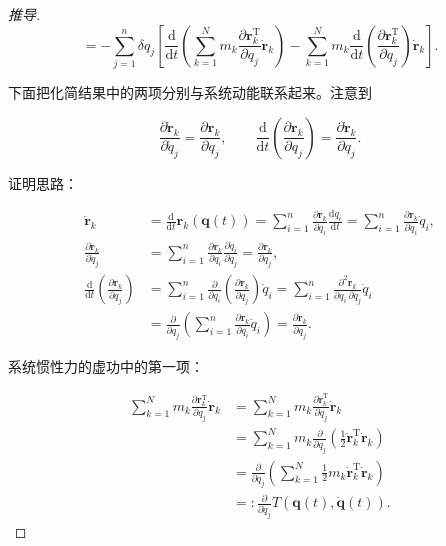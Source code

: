 \begin{proof}[推导]
\[
= -\sum_{j=1}^{n} \delta q_j \left[ \frac{\mathrm{d}}{\mathrm{d}t}\left(\sum_{k=1}^{N} m_k \frac{\partial \boldsymbol{r}_k^{\mathrm{T}}}{\partial q_j}\dot{\boldsymbol{r}}_k\right) - \sum_{k=1}^{N} m_k \frac{\mathrm{d}}{\mathrm{d}t}\left(\frac{\partial \boldsymbol{r}_k^{\mathrm{T}}}{\partial q_j}\right)\dot{\boldsymbol{r}}_k \right].
\]

下面把化简结果中的两项分别与系统动能联系起来。注意到

\[
\frac{\partial \dot{\boldsymbol{r}}_k}{\partial \dot{q}_j} = \frac{\partial \boldsymbol{r}_k}{\partial q_j},
\qquad
\frac{\mathrm{d}}{\mathrm{d}t}\left(\frac{\partial \boldsymbol{r}_k}{\partial q_j}\right) = \frac{\partial \dot{\boldsymbol{r}}_k}{\partial q_j}.
\]

证明思路：

\[
\begin{aligned}
\dot{\boldsymbol{r}}_k &= \frac{\mathrm{d}}{\mathrm{d}t}\boldsymbol{r}_k\left(\boldsymbol{q}(t)\right) = \sum_{i=1}^{n} \frac{\partial \boldsymbol{r}_k}{\partial q_i}\frac{\mathrm{d}q_i}{\mathrm{d}t} = \sum_{i=1}^{n} \frac{\partial \boldsymbol{r}_k}{\partial q_i}\dot{q}_i, \\
\frac{\partial \dot{\boldsymbol{r}}_k}{\partial \dot{q}_j} &= \sum_{i=1}^{n} \frac{\partial \boldsymbol{r}_k}{\partial q_i}\frac{\partial \dot{q}_i}{\partial \dot{q}_j} = \frac{\partial \boldsymbol{r}_k}{\partial q_j}, \\
\frac{\mathrm{d}}{\mathrm{d}t}\left(\frac{\partial \boldsymbol{r}_k}{\partial q_j}\right) &= \sum_{i=1}^{n} \frac{\partial}{\partial q_i}\left(\frac{\partial \boldsymbol{r}_k}{\partial q_j}\right)\dot{q}_i = \sum_{i=1}^{n} \frac{\partial^2 \boldsymbol{r}_k}{\partial q_i\,\partial q_j}\dot{q}_i \\
&= \frac{\partial}{\partial q_j}\left(\sum_{i=1}^{n} \frac{\partial \boldsymbol{r}_k}{\partial q_i}\dot{q}_i\right) = \frac{\partial \dot{\boldsymbol{r}}_k}{\partial q_j}.
\end{aligned}
\]

系统惯性力的虚功中的第一项：

\[
\begin{aligned}
\sum_{k=1}^{N} m_k \frac{\partial \boldsymbol{r}_k^{\mathrm{T}}}{\partial q_j}\dot{\boldsymbol{r}}_k
&= \sum_{k=1}^{N} m_k \frac{\partial \dot{\boldsymbol{r}}_k^{\mathrm{T}}}{\partial \dot{q}_j}\dot{\boldsymbol{r}}_k \\
&= \sum_{k=1}^{N} m_k \frac{\partial}{\partial \dot{q}_j}\left(\frac{1}{2}\dot{\boldsymbol{r}}_k^{\mathrm{T}}\dot{\boldsymbol{r}}_k\right) \\
&= \frac{\partial}{\partial \dot{q}_j}\left(\sum_{k=1}^{N}\frac{1}{2}m_k\dot{\boldsymbol{r}}_k^{\mathrm{T}}\dot{\boldsymbol{r}}_k\right) \\
&=: \frac{\partial}{\partial \dot{q}_j}T\left(\boldsymbol{q}(t),\dot{\boldsymbol{q}}(t)\right).
\end{aligned}
\]


\end{proof}
